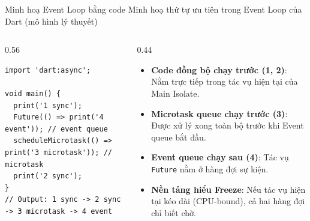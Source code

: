 \documentclass[aspectratio=169,11pt]{beamer}
\begin{document}
\begin{frame}[fragile]{Minh hoạ Event Loop bằng code}
  \vspace{-0.25cm}
  {\scriptsize\color{grayD} Minh hoạ thứ tự ưu tiên trong Event Loop của Dart (mô hình lý thuyết)}
  \vspace{0.05cm}
  \begin{columns}[T]
    \begin{column}{0.56\textwidth}
\begin{lstlisting}
import 'dart:async';

void main() {
  print('1 sync');
  Future(() => print('4 event')); // event queue
  scheduleMicrotask(() => print('3 microtask')); // microtask
  print('2 sync');
}
// Output: 1 sync -> 2 sync -> 3 microtask -> 4 event
\end{lstlisting}
    \end{column}
    \begin{column}{0.44\textwidth}
      \begin{itemize}
        \setlength{\itemsep}{0.08cm}
        \item \textbf{Code đồng bộ chạy trước (1, 2)}: Nằm trực tiếp trong tác vụ hiện tại của Main Isolate.
        \item \textbf{Microtask queue chạy trước (3)}: Được xử lý xong toàn bộ trước khi Event queue bắt đầu.
        \item \textbf{Event queue chạy sau (4)}: Tác vụ \texttt{Future} nằm ở hàng đợi sự kiện.
        \item \textbf{Nền tảng hiểu Freeze}: Nếu tác vụ hiện tại kéo dài (CPU-bound), cả hai hàng đợi chỉ biết chờ.
      \end{itemize}
    \end{column}
  \end{columns}
\end{frame}
\end{document}
